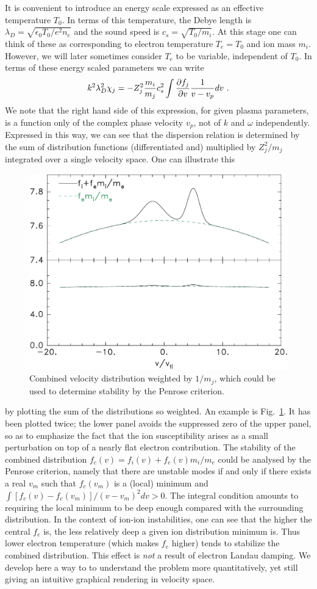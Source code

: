 \documentclass[12pt]{article}
\begin{document}
It is convenient to introduce an energy scale expressed as an
effective temperature $T_0$. In terms of this temperature, the Debye
length is $\lambda_{D} = \sqrt{\epsilon_0 T_0/e^2 n_e}$ and the sound
speed is $c_{s} = \sqrt{T_0/m_i}$. At this stage one can think of these as
corresponding to electron temperature $T_e=T_0$ and ion mass
$m_i$. However, we will later sometimes consider $T_e$ to be variable,
independent of $T_0$. In terms of these energy scaled parameters we
can write
\begin{equation}\label{ionint}
  k^2\lambda_{D}^2 \chi_j = -  Z_j^2 {m_i\over m_j} c_{s}^2 \int  {\partial
    f_j\over \partial v } {1\over v- v_p} dv\ .
\end{equation}
We note that the right hand side of this expression, for given plasma
parameters, is a function only of the complex phase velocity $v_p$,
not of $k$ and $\omega$ independently. Expressed in this way, we can
see that the dispersion relation is determined by the sum of
distribution functions (differentiated and) multiplied by $Z_j^2/m_j$
integrated over a single velocity space. One can illustrate this
\begin{figure}[htp]
  \centering
  \includegraphics[width=0.6\hsize]{combined}
  \caption{Combined velocity distribution weighted by $1/m_j$, which
    could be used to determine stability by the Penrose criterion.}
  \label{fig:penrose}
\end{figure}
by plotting the sum of the distributions so weighted. An example is
Fig.\ \ref{fig:penrose}. It has been plotted twice; the lower panel
avoids the suppressed zero of the upper panel, so as to emphasize the
fact that the ion susceptibility arises as a small perturbation on top
of a nearly flat electron contribution. The stability of the combined
distribution $f_c(v)=f_i(v)+ f_e(v)m_i/m_e$ could be analysed by the
Penrose criterion, namely that there are unstable modes if and only if
there exists a real $v_m$ such that $f_c(v_m)$ is a (local)
minimum and $\int[f_c(v)-f_c(v_m)]/(v-v_m)^2 dv>0$. The integral
condition amounts to requiring the local minimum to be deep enough
compared with the surrounding distribution. In the context of ion-ion
instabilities, one can see that the higher the central $f_e$ is, the
less relatively deep a given ion distribution minimum is. Thus lower
electron temperature (which makes $f_e$ higher) tends to stabilize the
combined distribution. This effect is \emph{not} a result of electron Landau
damping.  We develop here a way to to understand the problem more
quantitatively, yet still giving an intuitive graphical rendering in
velocity space.
\end{document}
